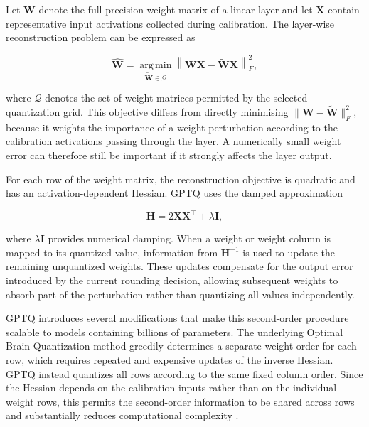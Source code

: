Let \(\mathbf{W}\) denote the full-precision weight matrix of a linear
layer and let \(\mathbf{X}\) contain representative input activations
collected during calibration. The layer-wise reconstruction problem can
be expressed as

\begin{equation}
\widehat{\mathbf{W}}
=
\underset{\widetilde{\mathbf{W}}\in\mathcal{Q}}
{\operatorname{arg\,min}}
\left\|
\mathbf{W}\mathbf{X}
-
\widetilde{\mathbf{W}}\mathbf{X}
\right\|_{F}^{2},
\label{eq:gptq-reconstruction}
\end{equation}

where \(\mathcal{Q}\) denotes the set of weight matrices permitted by
the selected quantization grid. This objective differs from directly
minimising
\(\|\mathbf{W}-\widetilde{\mathbf{W}}\|_{F}^{2}\), because it weights
the importance of a weight perturbation according to the calibration
activations passing through the layer. A numerically small weight error
can therefore still be important if it strongly affects the layer
output.

For each row of the weight matrix, the reconstruction objective is
quadratic and has an activation-dependent Hessian. GPTQ uses the
damped approximation

\begin{equation}
\mathbf{H}
=
2\mathbf{X}\mathbf{X}^{\top}
+
\lambda\mathbf{I},
\label{eq:gptq-hessian}
\end{equation}

where \(\lambda\mathbf{I}\) provides numerical damping. When a weight
or weight column is mapped to its quantized value, information from
\(\mathbf{H}^{-1}\) is used to update the remaining unquantized
weights. These updates compensate for the output error introduced by
the current rounding decision, allowing subsequent weights to absorb
part of the perturbation rather than quantizing all values
independently.

GPTQ introduces several modifications that make this second-order
procedure scalable to models containing billions of parameters. The
underlying Optimal Brain Quantization method greedily determines a
separate weight order for each row, which requires repeated and
expensive updates of the inverse Hessian. GPTQ instead quantizes all
rows according to the same fixed column order. Since the Hessian
depends on the calibration inputs rather than on the individual weight
rows, this permits the second-order information to be shared across
rows and substantially reduces computational complexity
\cite{frantar2023gptqaccurateposttrainingquantization}.

